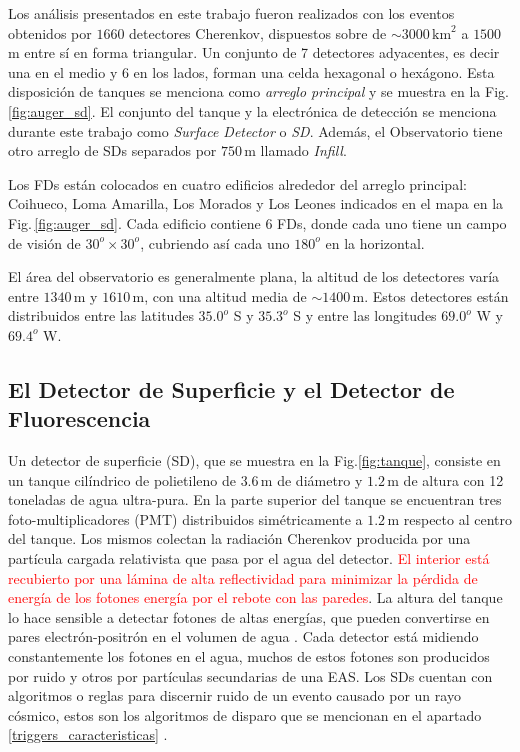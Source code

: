 Los análisis presentados en este trabajo fueron realizados con los eventos obtenidos por $ 1660$ detectores Cherenkov, dispuestos sobre de $\sim 3000\,\text{km}^2$ a  $1500\,$m entre sí en forma triangular. Un conjunto de 7 detectores adyacentes, es decir una en el medio y 6 en los lados, forman una celda hexagonal o hexágono. Esta disposición de tanques se menciona como \textit{arreglo principal} y se muestra en la Fig.\,\ref{fig:auger_sd}. El conjunto del tanque y la electrónica de detección  se menciona durante este trabajo como \textit{Surface Detector} o \textit{SD}. Además, el Observatorio tiene otro arreglo de SDs separados por $750\,$m llamado \emph{Infill}.



Los FDs están colocados en cuatro edificios alrededor del arreglo principal: Coihueco, Loma Amarilla, Los Morados y Los Leones indicados en el mapa en la Fig.\,\ref{fig:auger_sd}. Cada edificio contiene 6 FDs, donde cada uno tiene un campo de visión de $30^o\times30^o$, cubriendo así cada uno $180^o$ en la horizontal.

El área del observatorio es generalmente plana, la altitud de los detectores varía entre $1340\,$m y $1610\,$m, con una altitud media de $\sim1400\,$m. Estos detectores están distribuidos entre las latitudes $35.0^o$ S y $35.3^o$ S y entre las longitudes $69.0^o$ W y $69.4^o$ W.


\subsection{El Detector de Superficie y el Detector de Fluorescencia}
Un detector de superficie (SD), que se muestra en la Fig.\ref{fig:tanque}, consiste en un tanque cilíndrico de polietileno de $3.6\,$m de diámetro y $1.2\,$m de altura con 12 toneladas de agua ultra-pura.  En la parte superior del tanque se encuentran tres foto-multiplicadores (PMT) distribuidos simétricamente a $1.2\,$m respecto al centro del tanque. Los mismos colectan la radiación Cherenkov producida por una partícula cargada relativista que pasa por el agua del detector. \textcolor{red}{El interior está recubierto por una lámina de alta reflectividad para minimizar la pérdida de energía de los fotones energía por el rebote con las paredes}. La altura del tanque lo hace sensible a detectar fotones de altas energías, que pueden convertirse en pares electrón-positrón en el volumen de agua \cite{como_funciona_auger}. Cada detector está midiendo constantemente los fotones en el agua, muchos de estos fotones son producidos por ruido y otros por partículas secundarias de una EAS. Los SDs cuentan con algoritmos o reglas para discernir ruido de un evento causado por un rayo cósmico, estos son los algoritmos de disparo que se mencionan en el apartado \ref{triggers_caracteristicas} .

